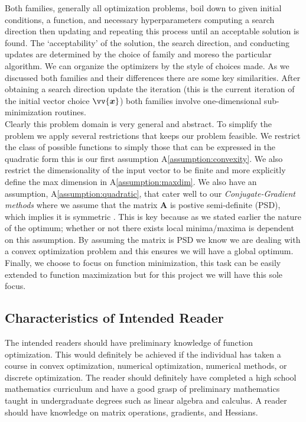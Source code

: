 \documentclass[12pt]{article}
\begin{document}
Both families, generally all optimization problems, boil down to given initial conditions, a function, and necessary hyperparameters computing a search direction then updating and repeating this process until an acceptable solution is found. The `acceptability' of the solution, the search direction, and conducting updates are determined by the choice of family and moreso the particular algorithm. We can organize the optimizers by the style of choices made. As we discussed both families and their differences there are some key similarities. After obtaining a search direction update the iteration (this is the current iteration of the initial vector choice $\vv{\bm{x}}$) both families involve one-dimensional sub-minimization routines. 
\\

Clearly this problem domain is very general and abstract. To simplify the problem we apply several restrictions that keeps our problem feasible. We restrict the class of possible functions to simply those that can be expressed in the quadratic form this is our first assumption A\ref{assumption:convexity}. We also restrict the dimensionality of the input vector to be finite and more explicitly define the max dimension in A\ref{assumption:maxdim}. We also have an assumption, A\ref{assumption:quadratic}, that cater well to our \textit{Conjugate-Gradient methods} where we assume that the matrix $\mathbf{A}$ is postive semi-definite (PSD), which implies it is symmetric \citep{Boyd2005ConvexO}. This is key because as we stated earlier the nature of the optimum; whether or not there exists local minima/maxima is dependent on this assumption. By assuming the matrix is PSD we know we are dealing with a convex optimization problem and this ensures we will have a global optimum. Finally, we choose to focus on function minimization, this task can be easily extended to function maximization but for this project we will have this sole focus.







\subsection{Characteristics of Intended Reader} \label{sec_IntendedReader}
The intended readers should have preliminary knowledge of function optimization. This would definitely be achieved if the individual has taken a course in convex optimization, numerical optimization, numerical methods, or discrete optimization. The reader should definitely have completed a high school mathematics curriculum and have a good grasp of preliminary mathematics taught in undergraduate degrees such as linear algebra and calculus. A reader should have knowledge on matrix operations, gradients, and Hessians.
\\
\end{document}

